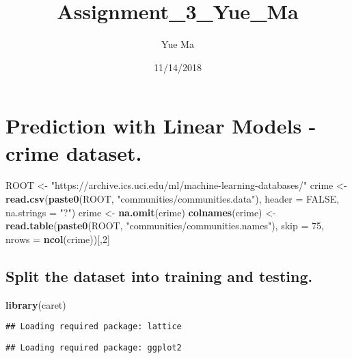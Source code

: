 \documentclass[]{article}
\title{Assignment\_3\_Yue\_Ma}
\author{Yue Ma}
\date{11/14/2018}
\newenvironment{Shaded}{\begin{snugshade}}{\end{snugshade}}
\newcommand{\KeywordTok}[1]{\textcolor[rgb]{0.13,0.29,0.53}{\textbf{#1}}}
\newcommand{\DataTypeTok}[1]{\textcolor[rgb]{0.13,0.29,0.53}{#1}}
\newcommand{\DecValTok}[1]{\textcolor[rgb]{0.00,0.00,0.81}{#1}}
\newcommand{\StringTok}[1]{\textcolor[rgb]{0.31,0.60,0.02}{#1}}
\newcommand{\OtherTok}[1]{\textcolor[rgb]{0.56,0.35,0.01}{#1}}
\newcommand{\OperatorTok}[1]{\textcolor[rgb]{0.81,0.36,0.00}{\textbf{#1}}}
\newcommand{\NormalTok}[1]{#1}
\begin{document}
\maketitle

\section{Prediction with Linear Models - crime
dataset.}\label{prediction-with-linear-models---crime-dataset.}

\begin{Shaded}
\begin{Highlighting}[]
\NormalTok{ROOT <-}\StringTok{ "https://archive.ics.uci.edu/ml/machine-learning-databases/"}
\NormalTok{crime <-}\StringTok{ }\KeywordTok{read.csv}\NormalTok{(}\KeywordTok{paste0}\NormalTok{(ROOT, }\StringTok{"communities/communities.data"}\NormalTok{),}
\DataTypeTok{header =} \OtherTok{FALSE}\NormalTok{, }\DataTypeTok{na.strings =} \StringTok{"?"}\NormalTok{)}
\NormalTok{crime <-}\StringTok{ }\KeywordTok{na.omit}\NormalTok{(crime)}
\KeywordTok{colnames}\NormalTok{(crime) <-}\StringTok{ }\KeywordTok{read.table}\NormalTok{(}\KeywordTok{paste0}\NormalTok{(ROOT, }\StringTok{"communities/communities.names"}\NormalTok{),}
\DataTypeTok{skip =} \DecValTok{75}\NormalTok{, }\DataTypeTok{nrows =} \KeywordTok{ncol}\NormalTok{(crime))[,}\DecValTok{2}\NormalTok{]}
\end{Highlighting}
\end{Shaded}

\subsection{Split the dataset into training and
testing.}\label{split-the-dataset-into-training-and-testing.}

\begin{Shaded}
\begin{Highlighting}[]
\KeywordTok{library}\NormalTok{(caret)}
\end{Highlighting}
\end{Shaded}

\begin{verbatim}
## Loading required package: lattice
\end{verbatim}

\begin{verbatim}
## Loading required package: ggplot2
\end{verbatim}

\begin{Shaded}
\end{Shaded}
\end{document}
